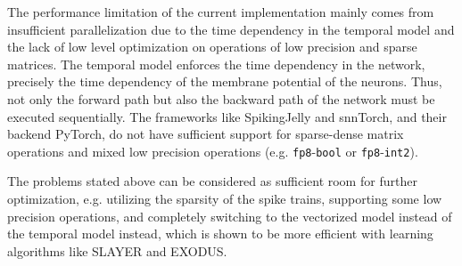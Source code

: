     The performance limitation of the current implementation mainly comes from insufficient parallelization due to the time dependency in the temporal model and the lack of low level optimization on operations of low precision and sparse matrices. The temporal model enforces the time dependency in the network, precisely the time dependency of the membrane potential of the neurons. Thus, not only the forward path but also the backward path of the network must be executed sequentially. The frameworks like SpikingJelly and snnTorch, and their backend PyTorch, do not have sufficient support for sparse-dense matrix operations and mixed low precision operations (e.g. \verb|fp8|-\verb|bool| or \verb|fp8|-\verb|int2|). 

    The problems stated above can be considered as sufficient room for further optimization, e.g. utilizing the sparsity of the spike trains, supporting some low precision operations, and completely switching to the vectorized model instead of the temporal model instead, which is shown to be more efficient with learning algorithms like SLAYER and EXODUS. 
